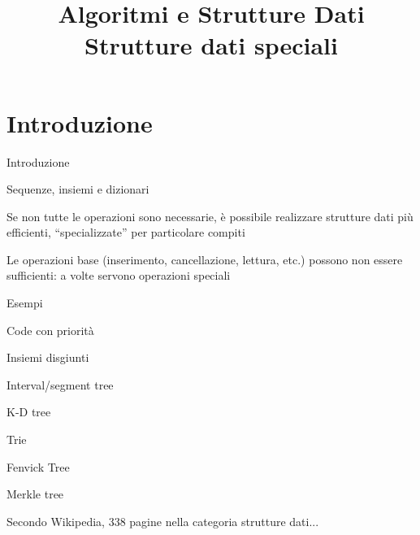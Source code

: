 


\title[ASD - Strutture speciali]{\textbf{Algoritmi e Strutture Dati}\\[24pt]
Strutture dati speciali}

\graphicspath{{figs/10/}}

\usepackage[export]{adjustbox}




\FrameTitle{}

\FrameContent

\section{Introduzione}

\begin{frame}{Introduzione}

\BIL
\item Sequenze, insiemi e dizionari
\EIL

\BIL
\item Se non tutte le operazioni sono necessarie, è possibile realizzare strutture dati più efficienti, “specializzate” per particolare compiti
\item Le operazioni base (inserimento, cancellazione, lettura, etc.) possono non essere sufficienti: a volte servono operazioni speciali
\EIL

\end{frame}

\begin{frame}{Esempi}

\BIL
\item \alert{Code con priorità}
\item \alert{Insiemi disgiunti}
\item Interval/segment tree
\item K-D tree
\item Trie
\item Fenvick Tree
\item Merkle tree
\item Secondo Wikipedia, 338 pagine nella categoria strutture dati...
\EIL
    
\end{frame}


